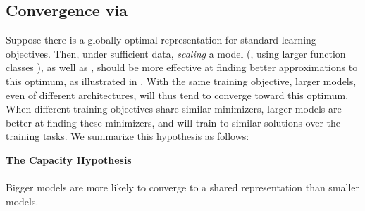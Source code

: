 \documentclass{article}
\newcommand{\fixme}[1]{{\bf\color{red}FIXME: #1}}
\newcommand{\jh}[1]{{\;\color{red}JH: #1}}
\newcommand{\hypbox}[2]{%
\begin{tcolorbox}[colback=white!98!black,colframe=white!30!black,boxsep=1.1pt,top=6.75pt]%
\vspace{1.75pt}%
\textbf{#1}\\[-0.575em]
\noindent\makebox[\textwidth]{\rule{\textwidth}{0.4pt}}
\\[0.25em]
#2
\end{tcolorbox}
}
\theoremstyle{plain}
\theoremstyle{definition}
\theoremstyle{remark}
\begin{document}







\subsection{Convergence via }\label{sec:capacity_hypothesis}


Suppose there is a globally optimal representation for standard learning objectives. Then, under sufficient data, \textit{scaling} a model (\ie, using larger function classes 
), as well as , should be more effective at finding better approximations to this optimum, as illustrated in . 
With the same training objective, larger models, even of different architectures, will thus tend to converge toward this optimum. When different training objectives share similar minimizers, larger models are better at finding these minimizers, 
and will train to similar solutions over the training tasks. We summarize this hypothesis as follows:
\hypbox{The Capacity Hypothesis}{%
Bigger models are more likely to converge to a shared representation than smaller models. 
}
\end{document}
